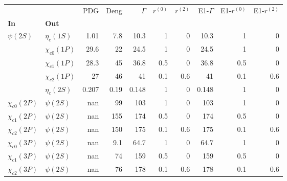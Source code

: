 \begin{tabular}{l|l|r|r|r|r|r|r|r|r}
\toprule
                &            &   PDG &  Deng &  $\Gamma$ &  $r^{(0)}$ &  $r^{(2)}$ &  E1-$\Gamma$ &  E1-$r^{(0)}$ &  E1-$r^{(2)}$ \\
\textbf{In} & \textbf{Out} &       &       &           &            &            &              &               &               \\
\midrule
\textbf{$\psi(2S)$} & \textbf{$\eta_{c}(1S)$} &  1.01 &   7.8 &      10.3 &          1 &          0 &         10.3 &             1 &             0 \\
                & \textbf{$\chi_{c0}(1P)$} &  29.6 &    22 &      24.5 &          1 &          0 &         24.5 &             1 &             0 \\
                & \textbf{$\chi_{c1}(1P)$} &  28.3 &    45 &      36.8 &        0.5 &          0 &         36.8 &           0.5 &             0 \\
                & \textbf{$\chi_{c2}(1P)$} &    27 &    46 &        41 &        0.1 &        0.6 &           41 &           0.1 &           0.6 \\
                & \textbf{$\eta_{c}(2S)$} & 0.207 &  0.19 &     0.148 &          1 &          0 &        0.148 &             1 &             0 \\
\textbf{$\chi_{c0}(2P)$} & \textbf{$\psi(2S)$} &   nan &    99 &       103 &          1 &          0 &          103 &             1 &             0 \\
\textbf{$\chi_{c1}(2P)$} & \textbf{$\psi(2S)$} &   nan &   155 &       174 &        0.5 &          0 &          174 &           0.5 &             0 \\
\textbf{$\chi_{c2}(2P)$} & \textbf{$\psi(2S)$} &   nan &   150 &       175 &        0.1 &        0.6 &          175 &           0.1 &           0.6 \\
\textbf{$\chi_{c0}(3P)$} & \textbf{$\psi(2S)$} &   nan &   9.1 &      64.7 &          1 &          0 &         64.7 &             1 &             0 \\
\textbf{$\chi_{c1}(3P)$} & \textbf{$\psi(2S)$} &   nan &    74 &       159 &        0.5 &          0 &          159 &           0.5 &             0 \\
\textbf{$\chi_{c2}(3P)$} & \textbf{$\psi(2S)$} &   nan &    76 &       178 &        0.1 &        0.6 &          178 &           0.1 &           0.6 \\
\bottomrule
\end{tabular}

